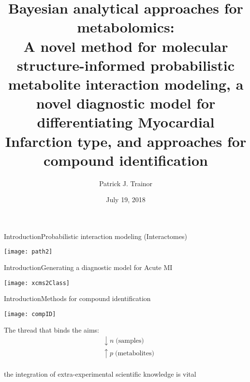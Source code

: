 \documentclass[xcolor=dvipsnames]{beamer}
\begin{document}
	
\title[Bayesian Methods for Metabolomics]{{\bf Bayesian analytical approaches for metabolomics:}\\ {\small A novel method for molecular structure-informed probabilistic metabolite interaction modeling, a novel diagnostic model for differentiating Myocardial Infarction type, and approaches for compound identification}}
\author[P.J. Trainor]{Patrick J. Trainor}
\date[July 2018]{July 19, 2018}

\begin{frame}
	\titlepage
\end{frame}

\begin{frame}{Introduction}{Probabilistic interaction modeling (Interactomes)}
	\vspace{-15pt}
	\begin{center}
		\texttt{[image: path2]}
	\end{center}
\end{frame}

\begin{frame}{Introduction}{Generating a diagnostic model for Acute MI}
	\vspace{-15pt}
	\begin{center}
		\texttt{[image: xcms2Class]}
	\end{center}
\end{frame}

\begin{frame}{Introduction}{Methods for compound identification}
	\vspace{-15pt}
	\begin{center}
		\texttt{[image: compID]}
	\end{center}
\end{frame}

\begin{frame}{}{}
	\vspace{-15pt}
	{\Huge
	The thread that binds the aims: \pause
	\begin{align*}
		&\downarrow n \; \text{(samples)} \\
		&\uparrow p  \; \text{(metabolites)}
	\end{align*}} \pause 
	{\LARGE \\the integration of extra-experimental scientific knowledge is vital}

\end{frame}
\end{document}
